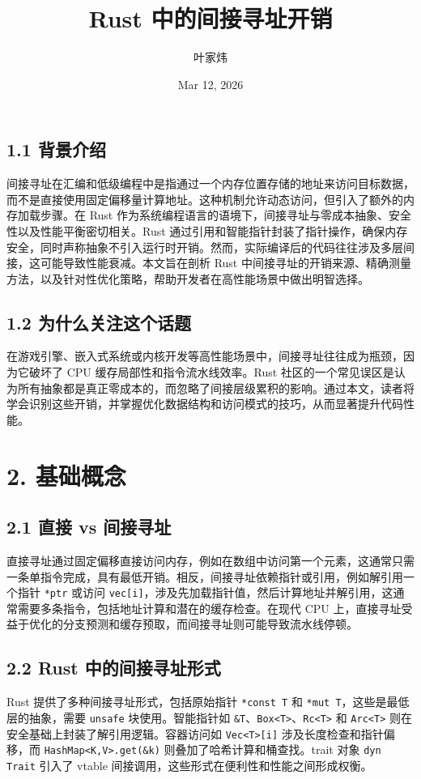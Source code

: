 \title{Rust 中的间接寻址开销}
\author{叶家炜}
\date{Mar 12, 2026}
\maketitle
\section{1.1 背景介绍}
间接寻址在汇编和低级编程中是指通过一个内存位置存储的地址来访问目标数据，而不是直接使用固定偏移量计算地址。这种机制允许动态访问，但引入了额外的内存加载步骤。在 Rust 作为系统编程语言的语境下，间接寻址与零成本抽象、安全性以及性能平衡密切相关。Rust 通过引用和智能指针封装了指针操作，确保内存安全，同时声称抽象不引入运行时开销。然而，实际编译后的代码往往涉及多层间接，这可能导致性能衰减。本文旨在剖析 Rust 中间接寻址的开销来源、精确测量方法，以及针对性优化策略，帮助开发者在高性能场景中做出明智选择。\par
\section{1.2 为什么关注这个话题}
在游戏引擎、嵌入式系统或内核开发等高性能场景中，间接寻址往往成为瓶颈，因为它破坏了 CPU 缓存局部性和指令流水线效率。Rust 社区的一个常见误区是认为所有抽象都是真正零成本的，而忽略了间接层级累积的影响。通过本文，读者将学会识别这些开销，并掌握优化数据结构和访问模式的技巧，从而显著提升代码性能。\par
\chapter{2. 基础概念}
\section{2.1 直接 vs 间接寻址}
直接寻址通过固定偏移直接访问内存，例如在数组中访问第一个元素，这通常只需一条单指令完成，具有最低开销。相反，间接寻址依赖指针或引用，例如解引用一个指针 \texttt{*ptr} 或访问 \texttt{vec[i]}，涉及先加载指针值，然后计算地址并解引用，这通常需要多条指令，包括地址计算和潜在的缓存检查。在现代 CPU 上，直接寻址受益于优化的分支预测和缓存预取，而间接寻址则可能导致流水线停顿。\par
\section{2.2 Rust 中的间接寻址形式}
Rust 提供了多种间接寻址形式，包括原始指针 \texttt{*const T} 和 \texttt{*mut T}，这些是最低层的抽象，需要 \texttt{unsafe} 块使用。智能指针如 \texttt{\&{}T}、\texttt{Box<T>}、\texttt{Rc<T>} 和 \texttt{Arc<T>} 则在安全基础上封装了解引用逻辑。容器访问如 \texttt{Vec<T>[i]} 涉及长度检查和指针偏移，而 \texttt{HashMap<K,V>.get(\&{}k)} 则叠加了哈希计算和桶查找。trait 对象 \texttt{dyn Trait} 引入了 vtable 间接调用，这些形式在便利性和性能之间形成权衡。\par
